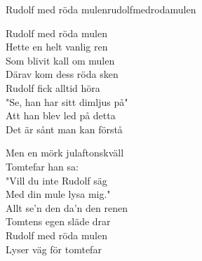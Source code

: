 \begin{song}{Rudolf med röda mulen}{rudolfmedrodamulen}
\begin{vers}
Rudolf med röda mulen\\
Hette en helt vanlig ren\\
Som blivit kall om mulen\\
Därav kom dess röda sken\\
Rudolf fick alltid höra\\
"Se, han har sitt dimljus på"\\
Att han blev led på detta\\
Det är sånt man kan förstå\\
\end{vers}
\begin{vers}
Men en mörk julaftonskväll\\
Tomtefar han sa:\\
"Vill du inte Rudolf säg\\
Med din mule lysa mig."\\
Allt se'n den da'n den renen\\
Tomtens egen släde drar\\
Rudolf med röda mulen\\
Lyser väg för tomtefar\\
\end{vers}
\end{song}
